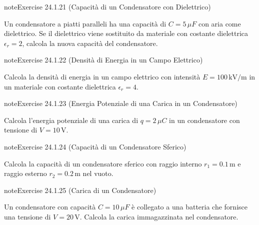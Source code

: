 \documentclass[letterpaper,10pt,italian]{jupyterBook}
\begin{document}
\begin{sphinxadmonition}{note}{Exercise 24.1.21 (Capacità di un Condensatore con Dielettrico)}



\sphinxAtStartPar
Un condensatore a piatti paralleli ha una capacità di \(C = 5 \, \mu F\) con aria come dielettrico. Se il dielettrico viene sostituito da materiale con costante dielettrica \(\epsilon_r = 2\), calcola la nuova capacità del condensatore.
\end{sphinxadmonition}
 \label{exercise:ch/electromagnetism/electrostatics-problems-exercise-21}

\begin{sphinxadmonition}{note}{Exercise 24.1.22 (Densità di Energia in un Campo Elettrico)}



\sphinxAtStartPar
Calcola la densità di energia in un campo elettrico con intensità \(E = 100 \, \text{kV/m}\) in un materiale con costante dielettrica \(\epsilon_r = 4\).
\end{sphinxadmonition}
 \label{exercise:ch/electromagnetism/electrostatics-problems-exercise-22}

\begin{sphinxadmonition}{note}{Exercise 24.1.23 (Energia Potenziale di una Carica in un Condensatore)}



\sphinxAtStartPar
Calcola l’energia potenziale di una carica di \(q = 2 \, \mu C\) in un condensatore con tensione di \(V = 10 \, \text{V}\).
\end{sphinxadmonition}
 \label{exercise:ch/electromagnetism/electrostatics-problems-exercise-23}

\begin{sphinxadmonition}{note}{Exercise 24.1.24 (Capacità di un Condensatore Sferico)}



\sphinxAtStartPar
Calcola la capacità di un condensatore sferico con raggio interno \(r_1 = 0.1 \, \text{m}\) e raggio esterno \(r_2 = 0.2 \, \text{m}\) nel vuoto.
\end{sphinxadmonition}
 \label{exercise:ch/electromagnetism/electrostatics-problems-exercise-24}

\begin{sphinxadmonition}{note}{Exercise 24.1.25 (Carica di un Condensatore)}



\sphinxAtStartPar
Un condensatore con capacità \(C = 10 \, \mu F\) è collegato a una batteria che fornisce una tensione di \(V = 20 \, \text{V}\). Calcola la carica immagazzinata nel condensatore.
\end{sphinxadmonition}
 \label{exercise:ch/electromagnetism/electrostatics-problems-exercise-25}
\end{document}
